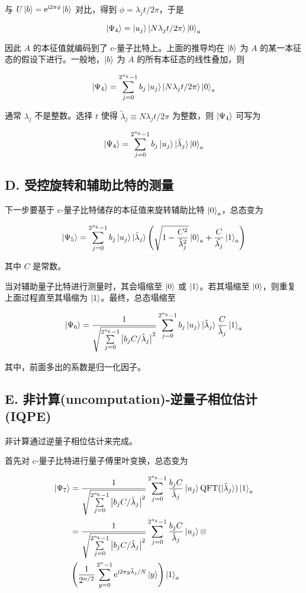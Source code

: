 \documentclass[aps,prl,twocolumn,groupedaddress]{revtex4-2}
\begin{document}
与 $U\ket{b}=\mathrm{e}^{\mathrm{i}2\pi \phi}\ket{b}$ 对比，得到 $\phi=\lambda_j t/2\pi$，于是

$$
\ket{\Psi_4}
=\ket{u_j} \ket{N\lambda_j t/2\pi}\ket{0}_a
$$

因此 $A$ 的本征值就编码到了 c-量子比特上。上面的推导均在 $\ket{b}$ 为 $A$ 的某一本征态的假设下进行。一般地，$\ket{b}$ 为 $A$ 的所有本征态的线性叠加，则

$$
\ket{\Psi_4}
=\sum_{j=0}^{2^{n_b}-1} b_j\ket{u_j}\ket{N\lambda_j t/2\pi} \ket{0}_a
$$

通常 $\lambda_j$ 不是整数。选择 $t$ 使得 $\tilde{\lambda}_j\equiv N\lambda_j t/2\pi$ 为整数，则 $\ket{\Psi_4} $ 可写为

$$
\ket{\Psi_4}
=\sum_{j=0}^{2^{n_b}-1} b_j \ket{u_j} \ket{\tilde{\lambda}_j}\ket{0}_a
$$

\subsection{D. 受控旋转和辅助比特的测量}

下一步要基于 c-量子比特储存的本征值来旋转辅助比特 $\ket{0}_a$，总态变为

$$
\ket{\Psi_5}
=\sum_{j=0}^{2^{n_b}-1}b_j\ket{u_j}\ket{\tilde{\lambda}_j}\left(\sqrt{1-\frac{C^2 }{\tilde{\lambda}_j^2 } }\ket{0}_a + \frac{C }{\tilde{\lambda_j} }\ket{1}_a \right)
$$

其中 $C$ 是常数。

当对辅助量子比特进行测量时，其会塌缩至 $\ket{0}$ 或 $\ket{1}$。若其塌缩至 $\ket{0}$，则重复上面过程直至其塌缩为 $\ket{1}$。最终，总态塌缩至

$$
\ket{\Psi_6}
=\frac{1 }{\sqrt{\sum\limits_{j=0}^{2^{n_b}-1}\left|b_j C/\tilde{\lambda}_j \right|^2} }\sum_{j=0}^{2^{n_b}-1}b_j \ket{u_j}\ket{\tilde{\lambda}_j}\frac{C }{\tilde{\lambda}_j }\ket{1}_a
$$

其中，前面多出的系数是归一化因子。

\subsection{E. 非计算(uncomputation)-逆量子相位估计(IQPE)}

非计算通过逆量子相位估计来完成。

首先对 c-量子比特进行量子傅里叶变换，总态变为

$$
\begin{aligned}
\ket{\Psi_7}
&=\frac{1 }{\sqrt{\sum\limits_{j=0}^{2^{n_b}-1}\left|b_j C/\tilde{\lambda}_j \right|^2} }\sum_{j=0}^{2^{n_b}-1}\frac{b_j C }{\tilde{\lambda}_j }  \ket{u_j}\mathrm{QFT}(\ket{\tilde{\lambda}_j})\ket{1}_a \\
&=\frac{1 }{\sqrt{\sum\limits_{j=0}^{2^{n_b}-1}\left|b_j C/\tilde{\lambda}_j \right|^2} }\sum_{j=0}^{2^{n_b}-1}\frac{b_j C }{\tilde{\lambda}_j }  \ket{u_j}\otimes \\
&\left(\frac{1 }{2^{n/2} } \sum_{y=0}^{2^n-1} \mathrm{e}^{\mathrm{i}2\pi y\tilde{\lambda}_j/N} \ket{y} \right) \ket{1}_a\\
\end{aligned}
$$
\end{document}
